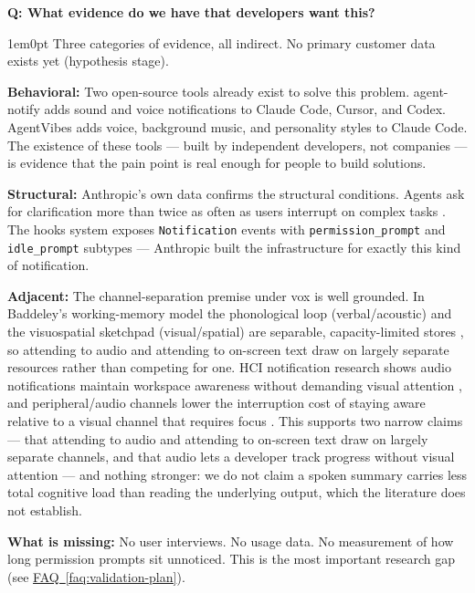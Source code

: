 \documentclass[11pt,letterpaper]{article}
\newcounter{faqnum}
\newenvironment{faqpair}[1]{%
  \needspace{4\baselineskip}%
  \vspace{0.5em}%
  \refstepcounter{faqnum}%
  \noindent\textbf{\color{SectionBlue}Q\thefaqnum: #1}\par\nopagebreak[4]%
  \vspace{0.2em}%
  \begin{adjustwidth}{1em}{0pt}%
  \setlength{\parindent}{0pt}%
}{%
  \end{adjustwidth}%
  \vspace{0.5em}%
}
\newcommand{\faqref}[1]{\hyperref[#1]{FAQ~\ref*{#1}}}
\begin{document}
\begin{faqpair}{What evidence do we have that developers want this?}\label{faq:evidence}
  Three categories of evidence, all indirect. No primary customer data exists
  yet (hypothesis stage).

  \textbf{Behavioral:} Two open-source tools already exist to solve this
  problem. agent-notify \cite{agentnotify2025} adds sound and voice
  notifications to Claude Code, Cursor, and Codex. AgentVibes
  \cite{agentvibes2025} adds voice, background music, and personality styles
  to Claude Code. The existence of these tools --- built by independent
  developers, not companies --- is evidence that the pain point is real enough
  for people to build solutions.

  \textbf{Structural:} Anthropic's own data confirms the structural
  conditions. Agents ask for clarification more than twice as often as users
  interrupt on complex tasks \cite{anthropic2026agentautonomy}. The hooks
  system exposes \texttt{Notification} events with
  \texttt{permission\_prompt} and \texttt{idle\_prompt} subtypes
  \cite{claudecodehooks2026} --- Anthropic built the infrastructure for
  exactly this kind of notification.

  \textbf{Adjacent:} The channel-separation premise under vox is
  well grounded. In Baddeley's working-memory model the phonological loop
  (verbal/acoustic) and the visuospatial sketchpad (visual/spatial) are
  separable, capacity-limited stores
  \cite{baddeleyhitch1974workingmemory,baddeley2000episodicbuffer}, so
  attending to audio and attending to on-screen text draw on largely separate
  resources rather than competing for one. HCI notification research shows
  audio notifications maintain workspace awareness without demanding visual
  attention \cite{springer2016audiovisual}, and peripheral/audio channels
  lower the interruption cost of staying aware relative to a visual channel
  that requires focus \cite{mccrickardchewar2003attuning}. This supports two
  narrow claims --- that attending to audio and attending to on-screen text
  draw on largely separate channels, and that audio lets a developer track
  progress without visual attention --- and nothing stronger: we do not claim a spoken summary carries
  less total cognitive load than reading the underlying output, which the
  literature does not establish.

  \textbf{What is missing:} No user interviews. No usage data. No measurement
  of how long permission prompts sit unnoticed. This is the most important
  research gap
  (see \faqref{faq:validation-plan}).
\end{faqpair}
\end{document}
